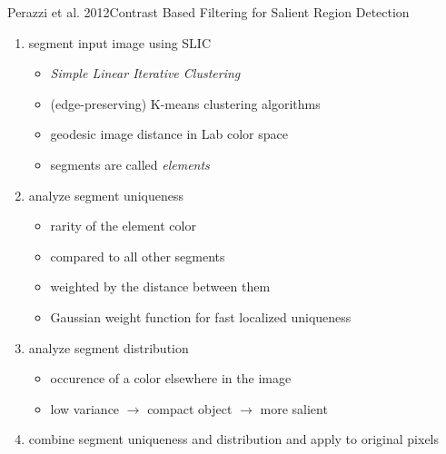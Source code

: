\documentclass[compress,t]{beamer}
\begin{document}
\begin{frame}{Perazzi et al. 2012}{Contrast Based Filtering for Salient Region Detection}
    \begin{enumerate}
        \item segment input image using SLIC
            \begin{itemize}
                \item \emph{Simple Linear Iterative Clustering}
                \item (edge-preserving) K-means clustering algorithms
                \item geodesic image distance in Lab color space
                \item segments are called \emph{elements}
            \end{itemize}
        \pause
        \item analyze segment uniqueness
            \begin{itemize}
                \item rarity of the element color
                \item compared to all other segments
                \item weighted by the distance between them
                \item Gaussian weight function for fast localized uniqueness
            \end{itemize}
        \pause
        \item analyze segment distribution
            \begin{itemize}
                \item occurence of a color elsewhere in the image
                \item low variance $\rightarrow$ compact object $\rightarrow$ more salient
            \end{itemize}
        \pause
        \item combine segment uniqueness and distribution and apply to original pixels
    \end{enumerate}
\end{frame}

\end{document}
